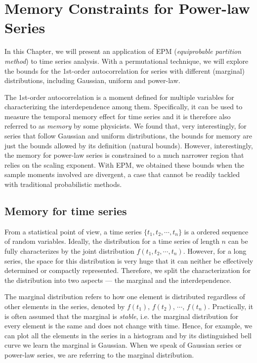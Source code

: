 
\chapter{Memory Constraints for Power-law Series}
In this Chapter, we will present an application of EPM (\textit{equiprobable partition method}) to time series analysis. With a permutational technique, we will explore the bounds for the 1st-order autocorrelation for series with different (marginal) distributions, including Gaussian, uniform and power-law. 

The 1st-order autocorrelation is a moment defined for multiple variables for characterizing the interdependence among them. Specifically, it can be used to measure the temporal memory effect for time series and it is therefore also referred to as \textit{memory} by some physicists. We found that, very interestingly, for series that follow Gaussian and uniform distributions, the bounds for memory are just the bounds allowed by its definition (natural bounds). However, interestingly, the memory for power-law series is constrained to a much narrower region that relies on the scaling exponent. With EPM, we obtained these bounds when the sample moments involved are divergent, a case that cannot be readily tackled with traditional probabilistic methods. 

\section{Memory for time series}

From a statistical point of view, a time series $ \{t_1, t_2, \cdots, t_n\} $ is a ordered sequence of random variables. Ideally, the distribution for a time series of length $ n $ can be fully characterizes by the joint distribution $ f(t_1, t_2, \cdots, t_n) $. However, for a long series, the space for this distribution is very huge that it can neither be effectively determined or compactly represented. Therefore, we split the characterization for the distribution into two aspects --- the marginal and the interdependence. 

The marginal distribution refers to how one element is distributed regardless of other elements in the series, denoted by $ f(t_1) $, $f(t_2) $, $ \cdots $, $ f(t_n) $. Practically, it is often assumed that the marginal is \textit{stable}, i.e. the marginal distribution for every element is the same and does not change with time. Hence, for example, we can plot all the elements in the series in a histogram and by its distinguished bell curve we learn the marginal is Gaussian. When we speak of Gaussian series or power-law series, we are referring to the marginal distribution.

